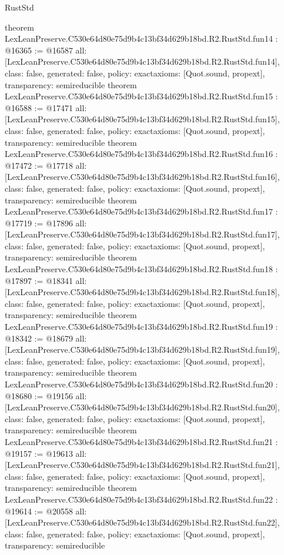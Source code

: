\begin{lexlean}{RustStd}
\begin{coremodule}
{}
theorem LexLeanPreserve.C530e64d80e75d9b4c13bf34d629b18bd.R2.RustStd.fun14 : @16365 := @16587 {
  all: [LexLeanPreserve.C530e64d80e75d9b4c13bf34d629b18bd.R2.RustStd.fun14],
  class: false,
  generated: false,
  policy: exact{axioms: [Quot.sound, propext]},
  transparency: semireducible
}
theorem LexLeanPreserve.C530e64d80e75d9b4c13bf34d629b18bd.R2.RustStd.fun15 : @16588 := @17471 {
  all: [LexLeanPreserve.C530e64d80e75d9b4c13bf34d629b18bd.R2.RustStd.fun15],
  class: false,
  generated: false,
  policy: exact{axioms: [Quot.sound, propext]},
  transparency: semireducible
}
theorem LexLeanPreserve.C530e64d80e75d9b4c13bf34d629b18bd.R2.RustStd.fun16 : @17472 := @17718 {
  all: [LexLeanPreserve.C530e64d80e75d9b4c13bf34d629b18bd.R2.RustStd.fun16],
  class: false,
  generated: false,
  policy: exact{axioms: [Quot.sound, propext]},
  transparency: semireducible
}
theorem LexLeanPreserve.C530e64d80e75d9b4c13bf34d629b18bd.R2.RustStd.fun17 : @17719 := @17896 {
  all: [LexLeanPreserve.C530e64d80e75d9b4c13bf34d629b18bd.R2.RustStd.fun17],
  class: false,
  generated: false,
  policy: exact{axioms: [Quot.sound, propext]},
  transparency: semireducible
}
theorem LexLeanPreserve.C530e64d80e75d9b4c13bf34d629b18bd.R2.RustStd.fun18 : @17897 := @18341 {
  all: [LexLeanPreserve.C530e64d80e75d9b4c13bf34d629b18bd.R2.RustStd.fun18],
  class: false,
  generated: false,
  policy: exact{axioms: [Quot.sound, propext]},
  transparency: semireducible
}
theorem LexLeanPreserve.C530e64d80e75d9b4c13bf34d629b18bd.R2.RustStd.fun19 : @18342 := @18679 {
  all: [LexLeanPreserve.C530e64d80e75d9b4c13bf34d629b18bd.R2.RustStd.fun19],
  class: false,
  generated: false,
  policy: exact{axioms: [Quot.sound, propext]},
  transparency: semireducible
}
theorem LexLeanPreserve.C530e64d80e75d9b4c13bf34d629b18bd.R2.RustStd.fun20 : @18680 := @19156 {
  all: [LexLeanPreserve.C530e64d80e75d9b4c13bf34d629b18bd.R2.RustStd.fun20],
  class: false,
  generated: false,
  policy: exact{axioms: [Quot.sound, propext]},
  transparency: semireducible
}
theorem LexLeanPreserve.C530e64d80e75d9b4c13bf34d629b18bd.R2.RustStd.fun21 : @19157 := @19613 {
  all: [LexLeanPreserve.C530e64d80e75d9b4c13bf34d629b18bd.R2.RustStd.fun21],
  class: false,
  generated: false,
  policy: exact{axioms: [Quot.sound, propext]},
  transparency: semireducible
}
theorem LexLeanPreserve.C530e64d80e75d9b4c13bf34d629b18bd.R2.RustStd.fun22 : @19614 := @20558 {
  all: [LexLeanPreserve.C530e64d80e75d9b4c13bf34d629b18bd.R2.RustStd.fun22],
  class: false,
  generated: false,
  policy: exact{axioms: [Quot.sound, propext]},
  transparency: semireducible
}
\end{coremodule}
\end{lexlean}
